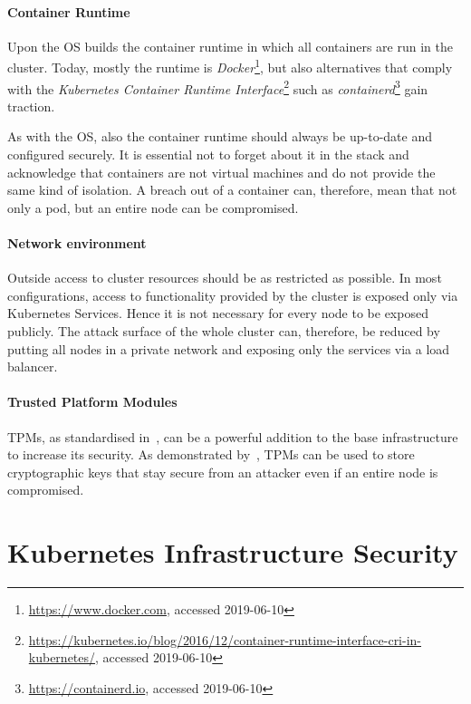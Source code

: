 \paragraph{Container Runtime}

Upon the OS builds the container runtime in which all containers are run in the cluster. Today, mostly the runtime is \textit{Docker}\footnote{\url{https://www.docker.com}, accessed 2019-06-10}, but also alternatives that comply with the \textit{Kubernetes Container Runtime Interface}\footnote{\url{https://kubernetes.io/blog/2016/12/container-runtime-interface-cri-in-kubernetes/}, accessed 2019-06-10} such as \textit{containerd}\footnote{\url{https://containerd.io}, accessed 2019-06-10} gain traction.

As with the OS, also the container runtime should always be up-to-date and configured securely. It is essential not to forget about it in the stack and acknowledge that containers are not virtual machines and do not provide the same kind of isolation. A breach out of a container can, therefore, mean that not only a pod, but an entire node can be compromised.

\paragraph{Network environment}

Outside access to cluster resources should be as restricted as possible. In most configurations, access to functionality provided by the cluster is exposed only via Kubernetes Services. Hence it is not necessary for every node to be exposed publicly. The attack surface of the whole cluster can, therefore, be reduced by putting all nodes in a private network and exposing only the services via a load balancer.

\paragraph{Trusted Platform Modules}

\acp{TPM}, as standardised in~\textcite{TPMStandard}, can be a powerful addition to the base infrastructure to increase its security. As demonstrated by~\textcite{TPM}, \acp{TPM} can be used to store cryptographic keys that stay secure from an attacker even if an entire node is compromised. 

\section{Kubernetes Infrastructure Security} \label{sec:layer2}

